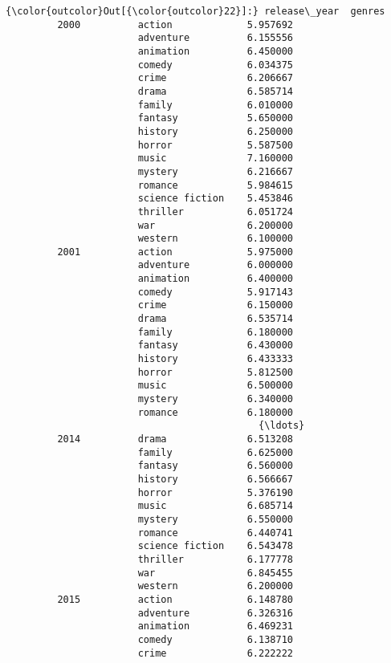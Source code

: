 \documentclass[11pt]{article}
\begin{document}
\begin{Verbatim}[commandchars=\\\{\}]
{\color{outcolor}Out[{\color{outcolor}22}]:} release\_year  genres         
         2000          action             5.957692
                       adventure          6.155556
                       animation          6.450000
                       comedy             6.034375
                       crime              6.206667
                       drama              6.585714
                       family             6.010000
                       fantasy            5.650000
                       history            6.250000
                       horror             5.587500
                       music              7.160000
                       mystery            6.216667
                       romance            5.984615
                       science fiction    5.453846
                       thriller           6.051724
                       war                6.200000
                       western            6.100000
         2001          action             5.975000
                       adventure          6.000000
                       animation          6.400000
                       comedy             5.917143
                       crime              6.150000
                       drama              6.535714
                       family             6.180000
                       fantasy            6.430000
                       history            6.433333
                       horror             5.812500
                       music              6.500000
                       mystery            6.340000
                       romance            6.180000
                                            {\ldots}   
         2014          drama              6.513208
                       family             6.625000
                       fantasy            6.560000
                       history            6.566667
                       horror             5.376190
                       music              6.685714
                       mystery            6.550000
                       romance            6.440741
                       science fiction    6.543478
                       thriller           6.177778
                       war                6.845455
                       western            6.200000
         2015          action             6.148780
                       adventure          6.326316
                       animation          6.469231
                       comedy             6.138710
                       crime              6.222222

\end{Verbatim}
\end{document}
